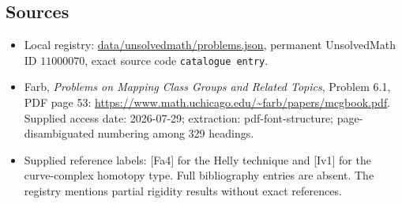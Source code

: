 \documentclass[11pt]{article}
\begin{document}
\subsection{Sources}
\begin{itemize}
\item Local registry: \url{data/unsolvedmath/problems.json}, permanent UnsolvedMath ID $11000070$, exact source code \texttt{catalogue entry}.
\item Farb, \emph{Problems on Mapping Class Groups and Related Topics}, Problem 6.1, PDF page 53: \url{https://www.math.uchicago.edu/~farb/papers/mcgbook.pdf}. Supplied access date: 2026-07-29; extraction: pdf-font-structure; page-disambiguated numbering among 329 headings.
\item Supplied reference labels: [Fa4] for the Helly technique and [Iv1] for the curve-complex homotopy type. Full bibliography entries are absent. The registry mentions partial rigidity results without exact references.
\end{itemize}
\end{document}
